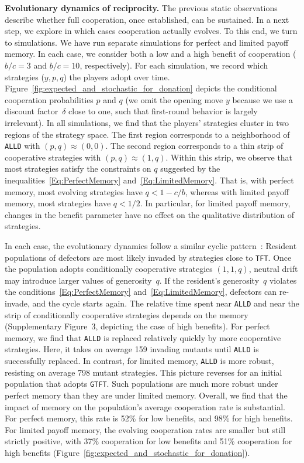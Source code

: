 \documentclass[11pt]{article}
\def\alld{\texttt{ALLD}}
\def\tft{\texttt{TFT}}
\def\gtft{\texttt{GTFT}}
\newcommand{\FigBaseResults}{Figure~\ref{fig:expected_and_stochastic_for_donation}}
\newcommand{\FigInvasionAnalysis}{{Supplementary Figure~3}}
\theoremstyle{plainCl1}
\theoremstyle{plainCl2}
\begin{document}
\noindent
{\bf Evolutionary dynamics of reciprocity.}
The previous static observations describe whether full cooperation, once established, can be sustained. 
In a next step, we explore in which cases cooperation actually evolves. 
To this end, we turn to simulations.
We have run separate simulations for perfect and limited payoff memory. 
In each case, we consider both a low and a high benefit of cooperation ($b/c\!=\!3$ and $b/c\!=\!10$, respectively).  
For each simulation, we record which strategies ($y,p,q$) the players adopt over time.
\FigBaseResults{} depicts the conditional cooperation probabilities $p$ and $q$ (we omit the opening move \(y\) because we use a discount factor~\(\delta\) close to one, such that first-round behavior is largely irrelevant). 
In all simulations, we find that the players' strategies cluster in two regions of the strategy space. 
The first region corresponds to a neighborhood of \alld{} with $(p,q)\!\approx\!(0,0)$.
The second region corresponds to a thin strip of cooperative strategies with $(p,q)\!\approx\!(1,q)$. 
Within this strip, we observe that most strategies satisfy the constraints on $q$ suggested by the inequalities~\eqref{Eq:PerfectMemory} and~\eqref{Eq:LimitedMemory}. 
That is, with perfect memory, most evolving strategies have $q\!<\!1\!-\!c/b$, whereas with limited payoff memory, most strategies have $q\!<\!1/2$. 
In particular, for limited payoff memory, changes in the benefit parameter have no effect on the qualitative distribution of strategies. 


In each case, the evolutionary dynamics follow a similar cyclic pattern~\citep[as described in Refs.][]{imhof2010stochastic, Nowak1992tit}:
Resident populations of defectors are most likely invaded by strategies close to \tft. 
Once the population adopts conditionally cooperative strategies  $(1,1,q)$, neutral drift may introduce larger values of generosity~$q$. 
If the resident's generosity~$q$ violates the conditions~\eqref{Eq:PerfectMemory} and~\eqref{Eq:LimitedMemory}, defectors can re-invade, and the cycle starts again. 
The relative time spent near \alld{} and near the strip of conditionally cooperative strategies depends on the memory (\FigInvasionAnalysis, depicting the case of high benefits). 
For perfect memory, we find that \alld{} is replaced relatively quickly by more cooperative strategies. 
Here, it takes on average 159 invading mutants until \alld{} is successfully replaced. 
In contrast, for limited memory, \alld{} is more robust, resisting on average 798 mutant strategies. 
This picture reverses for an initial population that adopts \gtft. 
Such populations are much more robust under perfect memory than they are under limited memory. 
Overall, we find that the impact of memory on the population's average cooperation rate is substantial. 
For perfect memory, this rate is 52\% for low benefits, and 98\% for high benefits. 
For limited payoff memory, the evolving cooperation rates are smaller but still strictly positive, with 37\% cooperation for low benefits and 51\% cooperation for high benefits (\FigBaseResults). 
\end{document}
